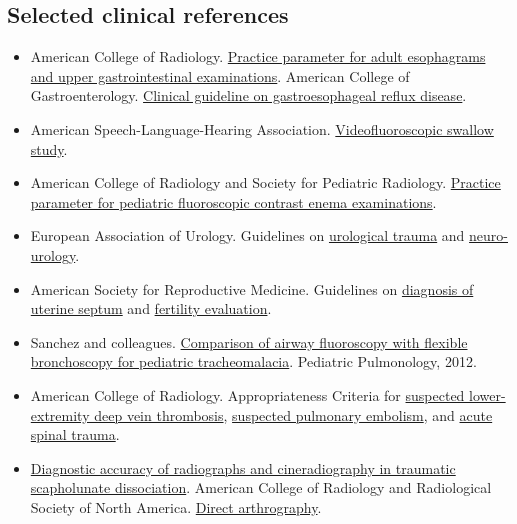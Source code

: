 \subsection{Selected clinical references}
\begin{itemize}
    \item American College of Radiology. \href{https://gravitas.acr.org/PPTS/DownloadPreviewDocument?DocId=46&ReleaseId=2}{Practice parameter for adult esophagrams and upper gastrointestinal examinations}. American College of Gastroenterology. \href{https://pmc.ncbi.nlm.nih.gov/articles/PMC8754510/}{Clinical guideline on gastroesophageal reflux disease}.
    \item American Speech-Language-Hearing Association. \href{https://www.asha.org/practice-portal/resources/videofluoroscopic-swallow-study/}{Videofluoroscopic swallow study}.
    \item American College of Radiology and Society for Pediatric Radiology. \href{https://gravitas.acr.org/PPTS/DownloadPreviewDocument?DocId=181&ReleaseId=2}{Practice parameter for pediatric fluoroscopic contrast enema examinations}.
    \item European Association of Urology. Guidelines on \href{https://uroweb.org/guidelines/urological-trauma/chapter/urogenital-trauma-guidelines}{urological trauma} and \href{https://uroweb.org/guidelines/neuro-urology}{neuro-urology}.
    \item American Society for Reproductive Medicine. Guidelines on \href{https://www.asrm.org/practice-guidance/practice-committee-documents/evidence-based-diagnosis-and-treatment-for-uterine-septum-a-guideline-2024/}{diagnosis of uterine septum} and \href{https://www.asrm.org/practice-guidance/practice-committee-documents/fertility-evaluation-of-infertile-women-a-committee-opinion-2026}{fertility evaluation}.
    \item Sanchez and colleagues. \href{https://pubmed.ncbi.nlm.nih.gov/21830315/}{Comparison of airway fluoroscopy with flexible bronchoscopy for pediatric tracheomalacia}. Pediatric Pulmonology, 2012.
    \item American College of Radiology. Appropriateness Criteria for \href{https://acsearch.acr.org/docs/69416/Narrative/}{suspected lower-extremity deep vein thrombosis}, \href{https://acsearch.acr.org/docs/69404/Narrative/}{suspected pulmonary embolism}, and \href{https://pubmed.ncbi.nlm.nih.gov/40409895/}{acute spinal trauma}.
    \item \href{https://pubmed.ncbi.nlm.nih.gov/18087747/}{Diagnostic accuracy of radiographs and cineradiography in traumatic scapholunate dissociation}. American College of Radiology and Radiological Society of North America. \href{https://www.radiologyinfo.org/en/info/arthrog}{Direct arthrography}.
\end{itemize}
